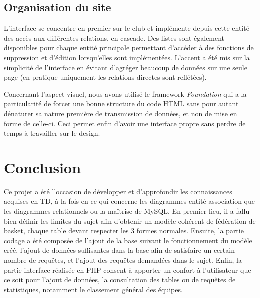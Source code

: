 \documentclass[a4paper,12pt]{article}
\begin{document}
\subsection{Organisation du site}
L'interface se concentre en premier sur le club et implémente depuis cette entité des accès aux différentes relations, en cascade. Des listes sont également disponibles pour chaque entité principale permettant d'accéder à des fonctions de suppression et d'édition lorsqu'elles sont implémentées. L'accent a été mis sur la simplicité de l'interface en évitant d'agréger beaucoup de données sur une seule page (en pratique uniquement les relations directes sont reflétées).

Concernant l'aspect visuel, nous avons utilisé le framework \emph{Foundation} qui a la particularité de forcer une bonne structure du code HTML sans pour autant dénaturer sa nature première de transmission de données, et non de mise en forme de celle-ci. Ceci permet enfin d'avoir une interface propre sans perdre de temps à travailler sur le design.

\section{Conclusion}
Ce projet a été l'occasion de développer et d'approfondir les connaissances acquises en TD, à la fois en ce qui concerne les diagrammes entité-association que les diagrammes relationnels ou la maîtrise de MySQL. En premier lieu, il a fallu bien définir les limites du sujet afin d'obtenir un modèle cohérent de fédération de basket, chaque table devant respecter les 3 formes normales. Ensuite, la partie codage a été composée de l'ajout de la base suivant le fonctionnement du modèle créé, l'ajout de données suffisantes dans la base afin de satisfaire un certain nombre de requêtes, et l'ajout des requêtes demandées dans le sujet. Enfin, la partie interface réalisée en PHP consent à apporter un confort à l'utilisateur que ce soit pour l'ajout de données, la consultation des tables ou de requêtes de statistiques, notamment le classement général des équipes.
\end{document}
